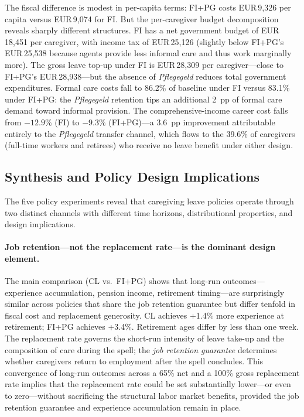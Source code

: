The fiscal difference is modest in per-capita terms: FI+PG costs EUR\,9,326 per capita versus EUR\,9,074 for FI. But the per-caregiver budget decomposition reveals sharply different structures. FI has a net government budget of EUR\,18,451 per caregiver, with income tax of EUR\,25,126 (slightly below FI+PG's EUR\,25,538 because agents provide less informal care and thus work marginally more). The gross leave top-up under FI is EUR\,28,309 per caregiver---close to FI+PG's EUR\,28,938---but the absence of \textit{Pflegegeld} reduces total government expenditures. Formal care costs fall to 86.2\% of baseline under FI versus 83.1\% under FI+PG: the \textit{Pflegegeld} retention tips an additional 2~pp of formal care demand toward informal provision. The comprehensive-income career cost falls from $-12.9\%$ (FI) to $-9.3\%$ (FI+PG)---a 3.6~pp improvement attributable entirely to the \textit{Pflegegeld} transfer channel, which flows to the 39.6\% of caregivers (full-time workers and retirees) who receive no leave benefit under either design.

\subsection{Synthesis and Policy Design Implications}
\label{subsec:synthesis}

The five policy experiments reveal that caregiving leave policies operate through two distinct channels with different time horizons, distributional properties, and design implications.

\paragraph{Job retention---not the replacement rate---is the dominant design element.}

The main comparison (CL vs.\ FI+PG) shows that long-run outcomes---experience accumulation, pension income, retirement timing---are surprisingly similar across policies that share the job retention guarantee but differ tenfold in fiscal cost and replacement generosity. CL achieves +1.4\% more experience at retirement; FI+PG achieves +3.4\%. Retirement ages differ by less than one week. The replacement rate governs the short-run intensity of leave take-up and the composition of care during the spell; the \textit{job retention guarantee} determines whether caregivers return to employment after the spell concludes. This convergence of long-run outcomes across a 65\% net and a 100\% gross replacement rate implies that the replacement rate could be set substantially lower---or even to zero---without sacrificing the structural labor market benefits, provided the job retention guarantee and experience accumulation remain in place.

